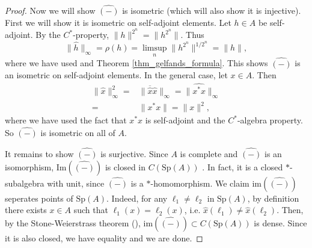 \documentclass[12pt]{article}
\begin{document}
\begin{proof}
	Now we will show $\widehat{(-)}$ is isometric (which will also show it is injective). First we will show it is isometric on self-adjoint elements. Let $h\in A$ be self-adjoint. By the $C^\ast$-property, $\|h\|^{2^n}=\|h^{2^n}\|$. Thus 
	\begin{equation*}
		\|\hat{h}\|_\infty = \rho(h) = \limsup_n\|h^{2^n}\|^{1/2^n} = \|h\|,
	\end{equation*}
	where we have used  and Theorem \ref{thm_gelfands_formula}. This shows $\widehat{(-)}$ is an isometric on self-adjoint elements. In the general case, let $x\in A$. Then 
	\begin{align*}
		\|\hat{x}\|^2_\infty 
		=& \|\overline{\hat{x}}\hat{x}\|_\infty = \|\widehat{x^\ast x}\|_\infty \\
		=& \|x^\ast x\| = \|x\|^2,
	\end{align*}
	where we have used the fact that $x^\ast x$ is self-adjoint and the $C^\ast$-algebra property. So $\widehat{(-)}$ is isometric on all of $A$.

	It remains to show $\widehat{(-)}$ is surjective. Since $A$ is complete and $\widehat{(-)}$ is an isomorphism, $\text{Im}(\widehat{(-)})$ is closed in $C(\text{Sp}(A))$ . In fact, it is a closed $\ast$-subalgebra with unit, since $\widehat{(-)}$ is a $\ast$-homomorphism. We claim $\text{im}(\widehat{(-)})$ seperates points of $\text{Sp}(A)$. Indeed, for any $\ell_1\neq\ell_2$ in $\text{Sp}(A)$, by definition there exists $x\in A$ such that $\ell_1(x)=\ell_2(x)$, i.e. $\hat{x}(\ell_1)\neq\hat{x}(\ell_2)$. Then, by the Stone-Weierstrass theorem (), $\text{im}(\widehat{(-)})\subset C(\text{Sp}(A))$ is dense. Since it is also closed, we have equality and we are done.
\end{proof}
\end{document}
